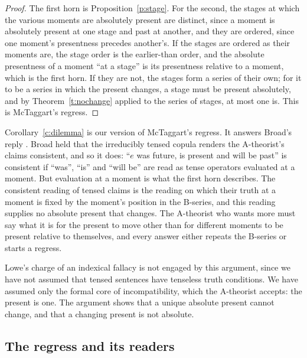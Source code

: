 \documentclass{situationist-preprint}
\begin{document}
\begin{proof}
The first horn is Proposition~\ref{p:stage}. For the second, the stages at which the various moments are absolutely present are distinct, since a moment is absolutely present at one stage and past at another, and they are ordered, since one moment's presentness precedes another's. If the stages are ordered as their moments are, the stage order is the earlier-than order, and the absolute presentness of a moment \enquote{at a stage} is its presentness relative to a moment, which is the first horn. If they are not, the stages form a series of their own; for it to be a series in which the present changes, a stage must be present absolutely, and by Theorem~\ref{t:nochange} applied to the series of stages, at most one is. This is McTaggart's regress.
\end{proof}

Corollary~\ref{c:dilemma} is our version of McTaggart's regress. It answers Broad's reply \citep{Broad1938}. Broad held that the irreducibly tensed copula renders the A-theorist's claims consistent, and so it does: \enquote{$e$ was future, is present and will be past} is consistent if \enquote{was}, \enquote{is} and \enquote{will be} are read as tense operators evaluated at a moment. But evaluation at a moment is what the first horn describes. The consistent reading of tensed claims is the reading on which their truth at a moment is fixed by the moment's position in the B-series, and this reading supplies no absolute present that changes. The A-theorist who wants more must say what it is for the present to move other than for different moments to be present relative to themselves, and every answer either repeats the B-series or starts a regress.

Lowe's charge of an indexical fallacy \citep{Lowe1987} is not engaged by this argument, since we have not assumed that tensed sentences have tenseless truth conditions. We have assumed only the formal core of incompatibility, which the A-theorist accepts: the present is one. The argument shows that a unique absolute present cannot change, and that a changing present is not absolute.

\subsection{The regress and its readers}
\end{document}
